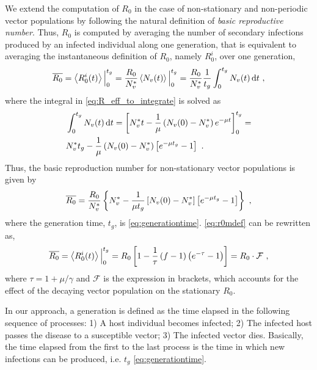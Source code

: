 We extend the computation of $R_0$ in the case of non-stationary and
non-periodic vector populations by following the natural definition of
\textit{basic reproductive number}. Thus, $R_0$ is computed by averaging the
number of  secondary infections produced by an infected individual along one
generation, that is equivalent to averaging the instantaneous definition of
$R_0$, namely $R_0^i$, over one generation,
\begin{equation}\label{eq:R_eff_to_integrate}
    \overline{R_0}=\left<R_0^i(t)\right>\Big\rvert_{0}^{t_g}=
    \frac{R_0}{N_v^*}\left<N_v(t)\right>\Big\rvert_{0}^{t_g}=
    \frac{R_0}{N_v^*}\frac{1}{t_g}\int_0^{t_g}N_v(t)
    \, \mathrm{d} t \ ,
\end{equation}
where the integral in \cref{eq:R_eff_to_integrate} is solved as
\begin{equation}
    \begin{aligned}
         & \int_0^{t_g}N_v(t) \, \mathrm{d} t=\left[N_v^*t
        -\frac{1}{\mu}\left(N_v(0)-N_v^*\right)e^{-\mu t}\right]_{0}^{t_g}=   \\
         & N_v^*t_g -\frac{1}{\mu}\left(N_v(0)-N_v^*\right)\left[e^{-\mu
                    t_g} - 1\right] \ .
    \end{aligned}
\end{equation}
Thus, the basic reproduction number for non-stationary vector populations
is given by
\begin{equation}
    \overline{R_0}=\frac{R_0}{N_v^*}\left\{N_v^*-\frac{1}{\mu
        t_g}\claudator{N_v(0)-N_v^*}\claudator{e^{-\mu t_g}-1}\right\} \ ,
    \label{eq:r0mdef}
\end{equation}
where the generation time, $t_g$, is \cref{eq:generationtime}.
\cref{eq:r0mdef} can be rewritten as,
\begin{equation}
    \overline{R_0}=\left<R_{0}^{i}(t)\right>\Big\rvert_{0}^{t_g}=
    R_0\left[1-\frac{1}{\tau}\left(f-1\right)
        \left(e^{-\tau}-1\right)\right]=R_0\cdot\mathcal{F}
    \ ,
    \label{eq:R0_non_stationary2}
\end{equation}
where $\tau=1+\mu/\gamma$ and $\mathcal{F}$ is the expression in brackets,
which accounts for the effect of the decaying vector population on the
stationary $R_0$.

In our approach, a generation is defined as the time elapsed in the
following sequence of processes: 1) A host individual becomes infected; 2) The
infected host passes the disease to a susceptible vector; 3) The infected
vector dies. Basically, the time elapsed from the first to the last process is
the time in which new infections can be produced, i.e. $t_g$
\cref{eq:generationtime}.

